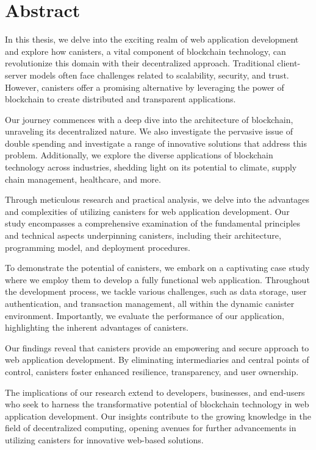 \chapter*{Abstract}
\label{chap:abstract}
In this thesis, we delve into the exciting realm of web application development and explore how canisters, a vital component of blockchain technology, can revolutionize this domain with their decentralized approach. Traditional client-server models often face challenges related to scalability, security, and trust. However, canisters offer a promising alternative by leveraging the power of blockchain to create distributed and transparent applications.

Our journey commences with a deep dive into the architecture of blockchain, unraveling its decentralized nature. We also investigate the pervasive issue of double spending and investigate a range of innovative solutions that address this problem. Additionally, we explore the diverse applications of blockchain technology across industries, shedding light on its potential to climate, supply chain management, healthcare, and more.

Through meticulous research and practical analysis, we delve into the advantages and complexities of utilizing canisters for web application development. Our study encompasses a comprehensive examination of the fundamental principles and technical aspects underpinning canisters, including their architecture, programming model, and deployment procedures.

To demonstrate the potential of canisters, we embark on a captivating case study where we employ them to develop a fully functional web application. Throughout the development process, we tackle various challenges, such as data storage, user authentication, and transaction management, all within the dynamic canister environment. Importantly, we evaluate the performance of our application, highlighting the inherent advantages of canisters.

Our findings reveal that canisters provide an empowering and secure approach to web application development. By eliminating intermediaries and central points of control, canisters foster enhanced resilience, transparency, and user ownership.

The implications of our research extend to developers, businesses, and end-users who seek to harness the transformative potential of blockchain technology in web application development. Our insights contribute to the growing knowledge in the field of decentralized computing, opening avenues for further advancements in utilizing canisters for innovative web-based solutions.